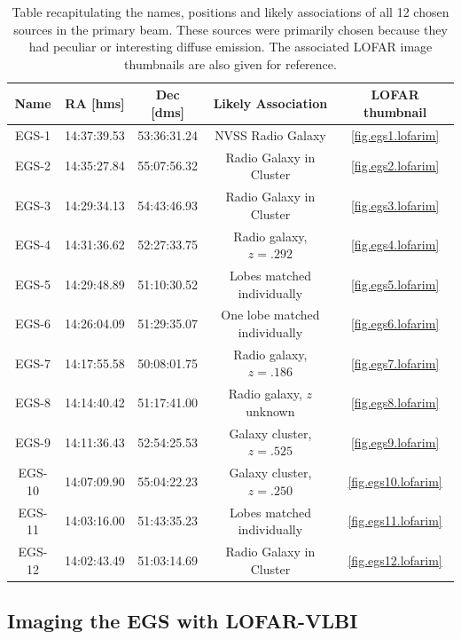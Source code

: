 \begin{table}[h!]
\begin{tabular}{ccccc}
Name    & RA [hms]    & Dec [dms]   & Likely Association            & LOFAR thumbnail \\\hline
EGS-1   & 14:37:39.53 & 53:36:31.24 & NVSS Radio Galaxy             & \cref{fig.egs1.lofarim} \\
EGS-2   & 14:35:27.84 & 55:07:56.32 & Radio Galaxy in Cluster       & \cref{fig.egs2.lofarim} \\ 
EGS-3   & 14:29:34.13 & 54:43:46.93 & Radio Galaxy in Cluster       & \cref{fig.egs3.lofarim} \\
EGS-4   & 14:31:36.62 & 52:27:33.75 & Radio galaxy, $z=.292$        & \cref{fig.egs4.lofarim} \\
EGS-5   & 14:29:48.89 & 51:10:30.52 & Lobes matched individually    & \cref{fig.egs5.lofarim} \\
EGS-6   & 14:26:04.09 & 51:29:35.07 & One lobe matched individually & \cref{fig.egs6.lofarim} \\
EGS-7   & 14:17:55.58 & 50:08:01.75 & Radio galaxy, $z=.186$        & \cref{fig.egs7.lofarim} \\
EGS-8   & 14:14:40.42 & 51:17:41.00 & Radio galaxy, $z$ unknown     & \cref{fig.egs8.lofarim} \\
EGS-9   & 14:11:36.43 & 52:54:25.53 & Galaxy cluster, $z=.525$      & \cref{fig.egs9.lofarim} \\
EGS-10  & 14:07:09.90 & 55:04:22.23 & Galaxy cluster, $z=.250$      & \cref{fig.egs10.lofarim} \\
EGS-11  & 14:03:16.00 & 51:43:35.23 & Lobes matched individually    & \cref{fig.egs11.lofarim} \\
EGS-12  & 14:02:43.49 & 51:03:14.69 & Radio Galaxy in Cluster       & \cref{fig.egs12.lofarim} \\
\end{tabular}
\caption{\label{table.egs.sources1} Table recapitulating the names, positions and likely associations of all 12 chosen sources in the primary beam. These sources were primarily chosen because they had peculiar or interesting diffuse emission. The associated LOFAR image thumbnails are also given for reference.}
\end{table}

\subsection{Imaging the EGS with LOFAR-VLBI}

